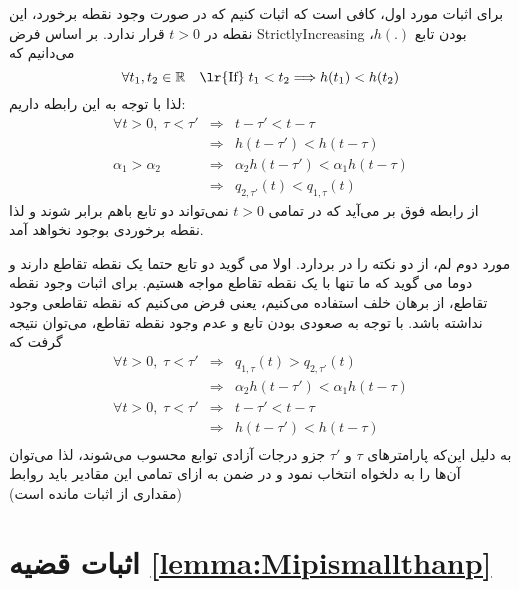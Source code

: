 \begin{lemmaproof}
برای اثبات مورد اول، کافی است که اثبات کنیم که در صورت وجود نقطه برخورد، این نقطه در $t>0$ قرار ندارد. بر اساس فرض ‎\gls{StrictlyIncreasing}‎ بودن تابع $h(.)$، می‌دانیم که
\begin{equation}
\forall t_{1}, t_{2}\in\mathbb{R}\quad \text{\lr{If}}\;  t_{1}<t_{2}\Longrightarrow h(t_{1})<h(t_{2})
\end{equation}
لذا با توجه به این رابطه داریم:
\begin{eqnarray}
\forall t>0,\;\tau < \tau' &\Longrightarrow& t-\tau' < t-\tau\nonumber\\
&\Longrightarrow& h(t-\tau') < h(t-\tau)\nonumber\\
\alpha_{1}> \alpha_{2} &\Longrightarrow& \alpha_{2}h(t-\tau') < \alpha_{1}h(t-\tau) \nonumber\\
&\Longrightarrow& q_{2,\tau'}(t) < q_{1,\tau}(t) 
\end{eqnarray}
از رابطه فوق بر می‌‌آید که در تمامی $t>0$ نمی‌تواند دو تابع باهم برابر شوند و لذا نقطه برخوردی بوجود نخواهد آمد.

مورد دوم لم، از دو نکته را در بردارد. اولا می گوید دو تابع حتما یک نقطه تقاطع دارند و دوما می گوید که ما تنها با یک نقطه تقاطع مواجه هستیم. برای اثبات وجود نقطه تقاطع، از برهان خلف استفاده می‌کنیم، یعنی فرض می‌کنیم که نقطه تقاطعی وجود نداشته باشد. با توجه به صعودی بودن تابع و عدم وجود نقطه تقاطع، می‌توان نتیجه گرفت که 
\begin{eqnarray}
\forall t>0,\;\tau < \tau'   &\Longrightarrow& q_{1,\tau}(t) >  q_{2,\tau'}(t)  \nonumber \\
&\Longrightarrow&  \alpha_{2}h(t-\tau') < \alpha_{1}h(t-\tau) \nonumber\\
\forall t>0,\;\tau < \tau' &\Longrightarrow& t-\tau' < t-\tau\nonumber\\
&\Longrightarrow& h(t-\tau') < h(t-\tau)\nonumber\\
\end{eqnarray}
به دلیل این‌که پارامترهای $‎\tau$ و $‎\tau'$ جزو درجات آزادی توابع محسوب می‌شوند، لذا می‌توان آن‌ها را به دلخواه انتخاب نمود و در ضمن به ازای تمامی این مقادیر باید روابط (مقداری از اثبات مانده است)

\end{lemmaproof}



\section{اثبات قضیه \ref{lemma:Mipismallthanp}}
\label{sec:Mipismallthanp}


